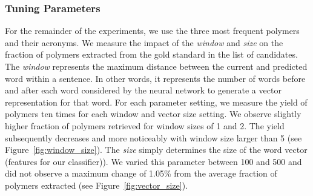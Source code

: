\subsubsection{Tuning Parameters}
For the remainder of the experiments, we use the three most frequent polymers and their acronyms. 
We measure the impact of the \textit{window} and \textit{size} on the fraction of polymers extracted from the gold standard in the list of  candidates.
The \textit{window} represents the maximum distance between the current and predicted word within a sentence. In other words, it represents the number of words before and after each word considered by the neural network to generate a vector representation for that word. 
For each parameter setting, we measure the yield of polymers ten times for each window and vector size setting.
We observe slightly higher fraction of polymers retrieved for window sizes of 1 and 2. The yield subsequently decreases and more noticeably with window size larger than 5 (see Figure~\ref{fig:window_size}).
The \textit{size} simply determines the size of the word vector (features for our classifier)).
We varied this parameter between 100 and 500 and did not observe a maximum change of 1.05\% from the average fraction of polymers extracted (see Figure~\ref{fig:vector_size}). %



